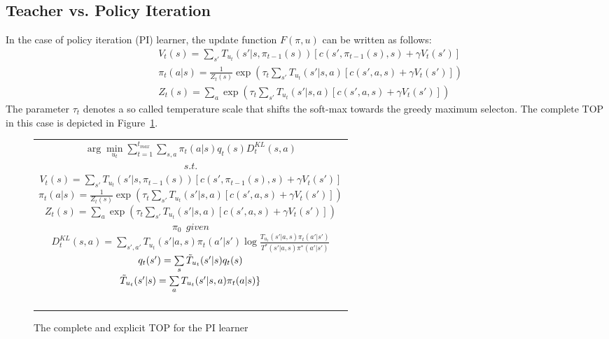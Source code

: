 \documentclass[letterpaper]{aamas2009}
\begin{document}
\subsection{Teacher vs. Policy Iteration}
In the case of policy iteration (PI) learner, the update function
$F(\pi,u)$ can be written as follows:
\begin{eqnarray*}
&V_t(s)=\sum\limits_{s'}T_{u_t}(s'|s,\pi_{t-1}(s))\left[
c(s',\pi_{t-1}(s),s)+\gamma V_t(s')
\right]\\
&\pi_t(a|s)=\frac{1}{Z_t(s)}\exp\left(\tau_t\sum\limits_{s'}T_{u_t}(s'|s,a)\left[
c(s',a,s)+\gamma V_t(s')
\right]\right)\\
&Z_t(s)=\sum\limits_a\exp\left(\tau_t\sum\limits_{s'}T_{u_t}(s'|s,a)\left[
c(s',a,s)+\gamma V_t(s')
\right]\right)
\end{eqnarray*}
The parameter $\tau_t$ denotes a so called temperature scale that
shifts the soft-max towards the greedy maximum selecton. The complete
TOP in this case is depicted in Figure~\ref{t_opt_PI}.
\begin{figure}[th]
\begin{tabular}{|c|} \hline \parbox{3.2 in} {\center 
$\arg\min\limits_{u_t}\sum\limits_{t=1}^{t_{max}}\sum\limits_{s,a}\pi_t(a|s)q_t(s)D^{KL}_t(s,a)$\\
$s.t.$\\
$V_t(s)=\sum\limits_{s'}T_{u_t}(s'|s,\pi_{t-1}(s))\left[
c(s',\pi_{t-1}(s),s)+\gamma V_t(s')
\right]$\\
$\pi_t(a|s)=\frac{1}{Z_t(s)}\exp\left(\tau_t\sum\limits_{s'}T_{u_t}(s'|s,a)\left[
c(s',a,s)+\gamma V_t(s')
\right]\right)$\\
$Z_t(s)=\sum\limits_a\exp\left(\tau_t\sum\limits_{s'}T_{u_t}(s'|s,a)\left[
c(s',a,s)+\gamma V_t(s')
\right]\right)$\\
$\pi_0\ \ \displaystyle{given}$\\
$D^{KL}_t(s,a)=\sum\limits_{s',a'}T_{u_t}(s'|a,s)\pi_t(a'|s')\log\frac{T_{u_t}(s'|a,s)\pi_t(a'|s')}{T^*(s'|a,s)\pi^*(a'|s')}$\\
$q_t(s')=\sum\limits_s\Tilde{T}_{u_t}(s'|s)q_t(s)$\\
$\Tilde{T}_{u_t}(s'|s)=\sum\limits_aT_{u_t}(s'|s,a)\pi_t(a|s)\}$\\\ \\
}\\ \hline \end{tabular}
\caption{\label{t_opt_PI}The complete and explicit TOP for the PI learner}
\end{figure}
\nocite{taylor_PhD_2008}
\nocite{taylor_stone_2009}
\nocite{rached_alajaji_campbell_2004}
\nocite{fleming_hernandez-hernandez_CDC_97}
\nocite{todorov_2009_framework_sup}
\nocite{todorov_2009_framework}
\nocite{ng_russell_2000}
\nocite{zhang_parkes_2008}
\nocite{zhang_parkes_2009_ed}
\nocite{dufton_larson_2009}
\nocite{banerjee_peng_2005}



\end{document}

